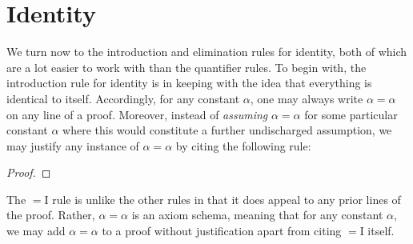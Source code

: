 






\section{Identity}

We turn now to the introduction and elimination rules for identity, both of which are a lot easier to work with than the quantifier rules.
To begin with, the introduction rule for identity is in keeping with the idea that everything is identical to itself.
Accordingly, for any constant $\alpha$, one may always write $\alpha = \alpha$ on any line of a proof.
Moreover, instead of \textit{assuming} $\alpha = \alpha$ for some particular constant $\alpha$ where this would constitute a further undischarged assumption, we may justify any instance of $\alpha = \alpha$ by citing the following rule: 

\begin{proof}
   
\end{proof}

The $=$I rule is unlike the other rules in that it does appeal to any prior lines of the proof.
Rather, $\alpha=\alpha$ is an axiom schema, meaning that for any constant $\alpha$, we may add $\alpha=\alpha$ to a proof without justification apart from citing $=$I itself. 

